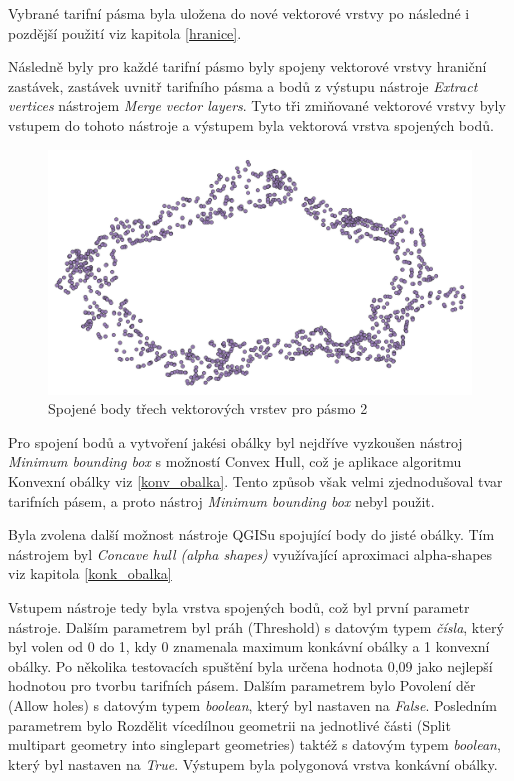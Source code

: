 Vybrané tarifní pásma byla uložena do nové vektorové vrstvy po následné i pozdější použití viz kapitola \ref{hranice}.

Následně byly pro každé tarifní pásmo byly spojeny vektorové vrstvy hraniční zastávek, 
zastávek uvnitř tarifního pásma a bodů z výstupu nástroje \textit{Extract vertices} nástrojem \textit{Merge vector layers}.
Tyto tři zmiňované vektorové vrstvy byly vstupem do tohoto nástroje a výstupem byla 
vektorová vrstva spojených bodů. 

\begin{figure}[H] \centering
    \includegraphics[width=400pt]{./pictures/merged.png}
    \caption[Spojené body třech vektorových vrstev pro pásmo 2]{Spojené body třech vektorových vrstev pro pásmo 2}
	\label{fig:merged}              
\end{figure} 

Pro spojení bodů a vytvoření jakési obálky byl nejdříve vyzkoušen nástroj \textit{Minimum bounding box} s možností Convex Hull,
což je aplikace algoritmu Konvexní obálky viz \ref{konv_obalka}. Tento způsob však velmi zjednodušoval tvar
tarifních pásem, a proto nástroj \textit{Minimum bounding box} nebyl použit.

Byla zvolena další možnost nástroje QGISu spojující body do jisté obálky. Tím nástrojem byl \textit{Concave hull (alpha shapes)} 
využívající aproximaci alpha-shapes viz kapitola \ref{konk_obalka}

Vstupem nástroje tedy byla vrstva spojených bodů, což byl první parametr
nástroje. Dalším parametrem byl práh (Threshold) s datovým typem \textit{čísla}, který byl volen od 0 do 1,
kdy 0 znamenala maximum konkávní obálky a 1 konvexní obálky. Po několika testovacích spuštění byla 
určena hodnota 0,09 jako nejlepší hodnotou pro tvorbu tarifních pásem. Dalším parametrem bylo Povolení děr (Allow holes) 
s datovým typem \textit{boolean}, který byl nastaven na \textit{False}.
Posledním parametrem bylo Rozdělit vícedílnou geometrii na jednotlivé části (Split multipart geometry 
into singlepart geometries) taktéž s datovým typem \textit{boolean}, který byl nastaven na \textit{True}.  
Výstupem byla polygonová vrstva konkávní obálky. 

